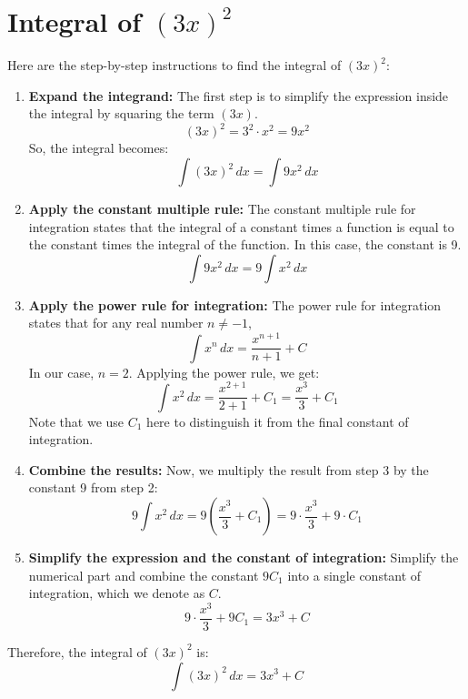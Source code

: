 \documentclass{article}
\begin{document}
\section*{Integral of $(3x)^2$}

Here are the step-by-step instructions to find the integral of $(3x)^2$:

\begin{enumerate}
    \item \textbf{Expand the integrand:}
    The first step is to simplify the expression inside the integral by squaring the term $(3x)$.
    $$ (3x)^2 = 3^2 \cdot x^2 = 9x^2 $$
    So, the integral becomes:
    $$ \int (3x)^2 \, dx = \int 9x^2 \, dx $$

    \item \textbf{Apply the constant multiple rule:}
    The constant multiple rule for integration states that the integral of a constant times a function is equal to the constant times the integral of the function. In this case, the constant is 9.
    $$ \int 9x^2 \, dx = 9 \int x^2 \, dx $$

    \item \textbf{Apply the power rule for integration:}
    The power rule for integration states that for any real number $n \neq -1$,
    $$ \int x^n \, dx = \frac{x^{n+1}}{n+1} + C $$
    In our case, $n = 2$. Applying the power rule, we get:
    $$ \int x^2 \, dx = \frac{x^{2+1}}{2+1} + C_1 = \frac{x^3}{3} + C_1 $$
    Note that we use $C_1$ here to distinguish it from the final constant of integration.

    \item \textbf{Combine the results:}
    Now, we multiply the result from step 3 by the constant 9 from step 2:
    $$ 9 \int x^2 \, dx = 9 \left( \frac{x^3}{3} + C_1 \right) = 9 \cdot \frac{x^3}{3} + 9 \cdot C_1 $$

    \item \textbf{Simplify the expression and the constant of integration:}
    Simplify the numerical part and combine the constant $9C_1$ into a single constant of integration, which we denote as $C$.
    $$ 9 \cdot \frac{x^3}{3} + 9 C_1 = 3x^3 + C $$

\end{enumerate}

Therefore, the integral of $(3x)^2$ is:
$$ \int (3x)^2 \, dx = 3x^3 + C $$
\end{document}
